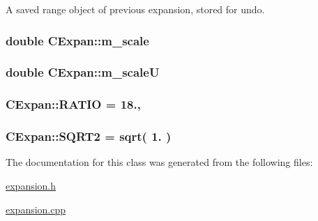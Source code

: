 A saved range object of previous expansion, stored for undo. 

\hypertarget{classCExpan_a4dba59941eefe0f6d70fb89f1e610d77}{
\subsubsection[{m\-\_\-scale}]{\setlength{\rightskip}{0pt plus 5cm}double C\-Expan\-::m\-\_\-scale\hspace{0.3cm}{\ttfamily [protected]}}}\label{classCExpan_a4dba59941eefe0f6d70fb89f1e610d77}
\hypertarget{classCExpan_a16aade514bb13da387040369e7137aeb}{
\subsubsection[{m\-\_\-scale\-U}]{\setlength{\rightskip}{0pt plus 5cm}double C\-Expan\-::m\-\_\-scale\-U\hspace{0.3cm}{\ttfamily [protected]}}}\label{classCExpan_a16aade514bb13da387040369e7137aeb}
\hypertarget{classCExpan_a1e3c0894a6550c4b01722e9741c83666}{
\subsubsection[{R\-A\-T\-I\-O}]{ C\-Expan\-::\-R\-A\-T\-I\-O = 18.\hspace{0.3cm}{\ttfamily [static]}, {\ttfamily [protected]}}}\label{classCExpan_a1e3c0894a6550c4b01722e9741c83666}
\hypertarget{classCExpan_aa5282327718d2c6dbff1ef2fbc0fe4dd}{
\subsubsection[{S\-Q\-R\-T2}]{ C\-Expan\-::\-S\-Q\-R\-T2 = sqrt( 1. )\hspace{0.3cm}{\ttfamily [static]}}}\label{classCExpan_aa5282327718d2c6dbff1ef2fbc0fe4dd}


The documentation for this class was generated from the following files\-:\begin{DoxyCompactItemize}
\item 
\hyperlink{expansion_8h}{expansion.\-h}\item 
\hyperlink{expansion_8cpp}{expansion.\-cpp}\end{DoxyCompactItemize}
